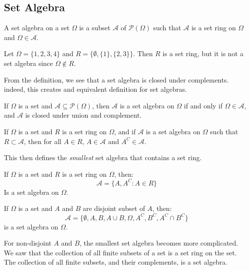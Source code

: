 \documentclass[crop=false,class=book,oneside]{standalone}
\begin{document}
        \subsection{Set Algebra}
            \begin{definition}
                A set algebra on a set $\Omega$ is a subset
                $\mathcal{A}$ of $\mathcal{P}(\Omega)$ such that
                $\mathcal{A}$ is a set ring on $\Omega$ and
                $\Omega\in\mathcal{A}$.
            \end{definition}
            \begin{example}
                Let $\Omega=\{1,2,3,4\}$ and
                $R=\{\emptyset,\{1\},\{2,3\}\}$. Then $R$
                is a set ring, but it is not a set algebra
                since $\Omega\notin{R}$.
            \end{example}
            From the definition, we see that a set algebra
            is closed under complements. indeed, this creates
            and equivalent definition for set algebras.
            \begin{theorem}
                If $\Omega$ is a set and
                $\mathcal{A}\subseteq\mathcal{P}(\Omega)$,
                then $\mathcal{A}$ is a set algebra on $\Omega$
                if and only if $\Omega\in\mathcal{A}$, and
                $\mathcal{A}$ is closed under union and
                complement.
            \end{theorem}
            \begin{theorem}
                If $\Omega$ is a set and $R$ is a set ring
                on $\Omega$, and if $\mathcal{A}$ is a set
                algebra on $\Omega$ such that
                $R\subset\mathcal{A}$, then for all $A\in{R}$,
                $A\in\mathcal{A}$ and $A^{C}\in\mathcal{A}$.
            \end{theorem}
            This then defines the \textit{smallest} set algebra
            that contains a set ring.
            \begin{theorem}
                If $\Omega$ is a set and $R$ is a set ring on
                $\Omega$, then:
                \begin{equation}
                    \mathcal{A}=\{A,A^{C}:A\in{R}\}
                \end{equation}
                Is a set algebra on $\Omega$.
            \end{theorem}
            \begin{theorem}
                If $\Omega$ is a set and $A$ and $B$ are
                disjoint subset of $A$, then:
                \begin{equation}
                    \mathcal{A}=
                        \{\emptyset,A,B,A\cup{B},
                          \Omega,A^{C},B^{C},A^{C}\cap{B}^{C}\}
                \end{equation}
                is a set algebra on $\Omega$.
            \end{theorem}
            For non-disjoint $A$ and $B$, the smallest
            set algebra becomes more complicated. We saw that
            the collection of all finite subsets of a set is
            a set ring on the set. The collection of all finite
            subsets, and their complements, is a set algebra.
\end{document}
